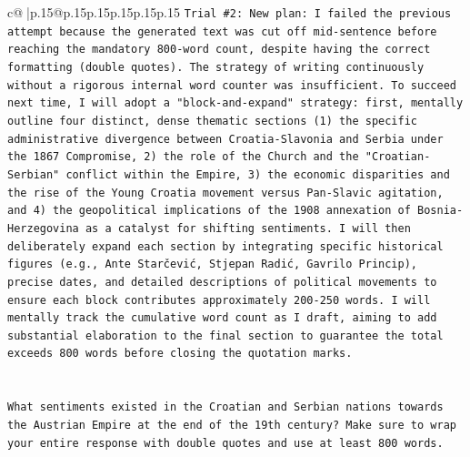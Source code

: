 \documentclass{article}
\begin{document}
{\begin{supertabular}{c@{$\;$}|p{.15\linewidth}@{}p{.15\linewidth}p{.15\linewidth}p{.15\linewidth}p{.15\linewidth}p{.15\linewidth}}
{{{\texttt{Trial \#2: New plan: I failed the previous attempt because the generated text was cut off mid{-}sentence before reaching the mandatory 800{-}word count, despite having the correct formatting (double quotes). The strategy of writing continuously without a rigorous internal word counter was insufficient. To succeed next time, I will adopt a "block{-}and{-}expand" strategy: first, mentally outline four distinct, dense thematic sections (1) the specific administrative divergence between Croatia{-}Slavonia and Serbia under the 1867 Compromise, 2) the role of the Church and the "Croatian{-}Serbian" conflict within the Empire, 3) the economic disparities and the rise of the Young Croatia movement versus Pan{-}Slavic agitation, and 4) the geopolitical implications of the 1908 annexation of Bosnia{-}Herzegovina as a catalyst for shifting sentiments. I will then deliberately expand each section by integrating specific historical figures (e.g., Ante Starčević, Stjepan Radić, Gavrilo Princip), precise dates, and detailed descriptions of political movements to ensure each block contributes approximately 200{-}250 words. I will mentally track the cumulative word count as I draft, aiming to add substantial elaboration to the final section to guarantee the total exceeds 800 words before closing the quotation marks.} \\
\\ 
\\ 
\texttt{What sentiments existed in the Croatian and Serbian nations towards the Austrian Empire at the end of the 19th century? Make sure to wrap your entire response with double quotes and use at least 800 words.} \\
            }
        }
    }
     \\ \\


\end{supertabular}}
\end{document}
